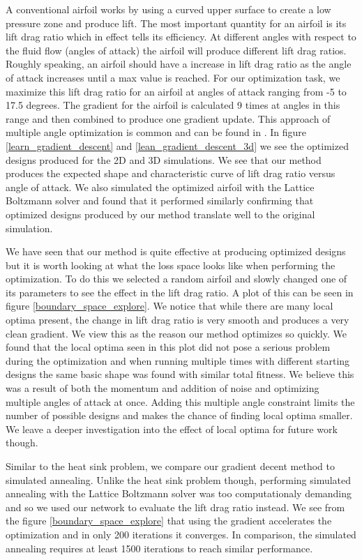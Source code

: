 \documentclass{article} %
\begin{document}
A conventional airfoil works by using a curved upper surface to create a low pressure zone and produce lift. The most important quantity for an airfoil is its lift drag ratio which in effect tells its efficiency. At different angles with respect to the fluid flow (angles of attack) the airfoil will produce different lift drag ratios. Roughly speaking, an airfoil should have a increase in lift drag ratio as the angle of attack increases until a max value is reached. For our optimization task, we maximize this lift drag ratio for an airfoil at angles of attack ranging from -5 to 17.5 degrees. The gradient for the airfoil is calculated 9 times at angles in this range and then combined to produce one gradient update. This approach of multiple angle optimization is common and can be found in \cite{drela1998pros}. In figure \ref{learn_gradient_descent} and \ref{lean_gradient_descent_3d} we see the optimized designs produced for the 2D and 3D simulations. We see that our method produces the expected shape and characteristic curve of lift drag ratio versus angle of attack. We also simulated the optimized airfoil with the Lattice Boltzmann solver and found that it performed similarly confirming that optimized designs produced by our method translate well to the original simulation.

We have seen that our method is quite effective at producing optimized designs but it is worth looking at what the loss space looks like when performing the optimization. To do this we selected a random airfoil and slowly changed one of its parameters to see the effect in the lift drag ratio. A plot of this can be seen in figure \ref{boundary_space_explore}. We notice that while there are many local optima present, the change in lift drag ratio is very smooth and produces a very clean gradient. We view this as the reason our method optimizes so quickly. We found that the local optima seen in this plot did not pose a serious problem during the optimization and when running multiple times with different starting designs the same basic shape was found with similar total fitness. We believe this was a result of both the momentum and addition of noise and optimizing multiple angles of attack at once. Adding this multiple angle constraint limits the number of possible designs and makes the chance of finding local optima smaller. We leave a deeper investigation into the effect of local optima for future work though.

Similar to the heat sink problem, we compare our gradient decent method to simulated annealing. Unlike the heat sink problem though, performing simulated annealing with the Lattice Boltzmann solver was too computationaly demanding and so we used our network to evaluate the lift drag ratio instead. We see from the figure \ref{boundary_space_explore} that using the gradient accelerates the optimization and in only 200 iterations it converges. In comparison, the simulated annealing requires at least 1500 iterations to reach similar performance.
\end{document}
